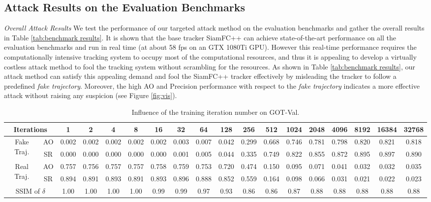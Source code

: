 \documentclass[journal]{IEEEtran}
\begin{document}
\subsection{Attack Results on the Evaluation Benchmarks}

\textit{Overall Attack Results} We test the performance of our targeted attack method on the evaluation benchmarks and gather the overall results in Table \ref{tab:benchmark results}. It is shown that the base tracker SiamFC++ can achieve state-of-the-art performance on all the evaluation benchmarks and run in real time (at about 58 fps on an GTX 1080Ti GPU). However this real-time performance requires the computationally intensive tracking system to occupy most of the computational resources, and thus it is appealing to develop a virtually costless attack method to fool the tracking system without scrambling for the resources. As shown in Table \ref{tab:benchmark results}, our attack method can satisfy this appealing demand and fool the SiamFC++ tracker effectively by misleading the tracker to follow a predefined \textit{fake trajectory}. Moreover, the high AO and Precision performance with respect to the \textit{fake trajectory} indicates a more effective attack without raising any suspicion (see Figure \ref{fig:vis}).

\begin{table}
\centering
\footnotesize
\tabcolsep=3.0pt
\caption{Influence of the training iteration number on GOT-Val.}
\begin{tabular}{cc|cccccccccccccccc} 
\toprule
\multicolumn{2}{c|}{Iterations}     & 1     & 2     & 4     & 8     & 16    & 32    & 64    & 128   & 256   & 512   & 1024  & 2048  & 4096  & 8192  & 16384 & 32768  \\ 
\midrule
\multirow{2}{*}{Fake Traj.} & AO    & 0.002 & 0.002 & 0.002 & 0.002 & 0.002 & 0.003 & 0.007 & 0.042 & 0.299 & 0.668 & 0.746 & 0.781 & 0.798 & 0.820 & 0.821 & 0.818  \\
                                 & SR    & 0.000 & 0.000 & 0.000 & 0.000 & 0.000 & 0.001 & 0.005 & 0.044 & 0.335 & 0.749 & 0.822 & 0.855 & 0.872 & 0.895 & 0.897 & 0.890  \\ 
\midrule
\multirow{2}{*}{Real Traj.} & AO    & 0.757 & 0.756 & 0.757 & 0.757 & 0.758 & 0.759 & 0.753 & 0.720 & 0.474 & 0.150 & 0.095 & 0.071 & 0.041 & 0.032 & 0.032 & 0.035  \\
                                 & SR    & 0.894 & 0.891 & 0.893 & 0.891 & 0.893 & 0.896 & 0.888 & 0.852 & 0.559 & 0.164 & 0.098 & 0.066 & 0.031 & 0.021 & 0.022 & 0.023  \\ 
\midrule
\multicolumn{2}{c|}{SSIM of $\delta$}                        & 1.00  & 1.00  & 1.00  & 1.00  & 0.99  & 0.99  & 0.97  & 0.93  & 0.86  & 0.86  & 0.87  & 0.88  & 0.88  & 0.88  & 0.88  & 0.88   \\
\bottomrule
\end{tabular}
\label{tab:iter}
\end{table}
\end{document}
